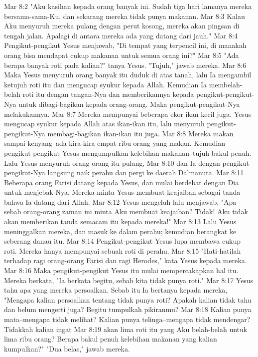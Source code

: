 Mar 8:2  "Aku kasihan kepada orang banyak ini. Sudah tiga hari lamanya mereka bersama-sama-Ku, dan sekarang mereka tidak punya makanan.
Mar 8:3  Kalau Aku menyuruh mereka pulang dengan perut kosong, mereka akan pingsan di tengah jalan. Apalagi di antara mereka ada yang datang dari jauh."
Mar 8:4  Pengikut-pengikut Yesus menjawab, "Di tempat yang terpencil ini, di manakah orang bisa mendapat cukup makanan untuk semua orang ini?"
Mar 8:5  "Ada berapa banyak roti pada kalian?" tanya Yesus. "Tujuh," jawab mereka.
Mar 8:6  Maka Yesus menyuruh orang banyak itu duduk di atas tanah, lalu Ia mengambil ketujuh roti itu dan mengucap syukur kepada Allah. Kemudian Ia membelah-belah roti itu dengan tangan-Nya dan memberikannya kepada pengikut-pengikut-Nya untuk dibagi-bagikan kepada orang-orang. Maka pengikut-pengikut-Nya melakukannya.
Mar 8:7  Mereka mempunyai beberapa ekor ikan kecil juga. Yesus mengucap syukur kepada Allah atas ikan-ikan itu, lalu menyuruh pengikut-pengikut-Nya membagi-bagikan ikan-ikan itu juga.
Mar 8:8  Mereka makan sampai kenyang--ada kira-kira empat ribu orang yang makan. Kemudian pengikut-pengikut Yesus mengumpulkan kelebihan makanan--tujuh bakul penuh. Lalu Yesus menyuruh orang-orang itu pulang,
Mar 8:10  dan Ia dengan pengikut-pengikut-Nya langsung naik perahu dan pergi ke daerah Dalmanuta.
Mar 8:11  Beberapa orang Farisi datang kepada Yesus, dan mulai berdebat dengan Dia untuk menjebak-Nya. Mereka minta Yesus membuat keajaiban sebagai tanda bahwa Ia datang dari Allah.
Mar 8:12  Yesus mengeluh lalu menjawab, "Apa sebab orang-orang zaman ini minta Aku membuat keajaiban? Tidak! Aku tidak akan memberikan tanda semacam itu kepada mereka!"
Mar 8:13  Lalu Yesus meninggalkan mereka, dan masuk ke dalam perahu; kemudian berangkat ke seberang danau itu.
Mar 8:14  Pengikut-pengikut Yesus lupa membawa cukup roti. Mereka hanya mempunyai sebuah roti di perahu.
Mar 8:15  "Hati-hatilah terhadap ragi orang-orang Farisi dan ragi Herodes," kata Yesus kepada mereka.
Mar 8:16  Maka pengikut-pengikut Yesus itu mulai mempercakapkan hal itu. Mereka berkata, "Ia berkata begitu, sebab kita tidak punya roti."
Mar 8:17  Yesus tahu apa yang mereka persoalkan. Sebab itu Ia bertanya kepada mereka, "Mengapa kalian persoalkan tentang tidak punya roti? Apakah kalian tidak tahu dan belum mengerti juga? Begitu tumpulkah pikiranmu?
Mar 8:18  Kalian punya mata--mengapa tidak melihat? Kalian punya telinga--mengapa tidak mendengar? Tidakkah kalian ingat
Mar 8:19  akan lima roti itu yang Aku belah-belah untuk lima ribu orang? Berapa bakul penuh kelebihan makanan yang kalian kumpulkan?" "Dua belas," jawab mereka.
